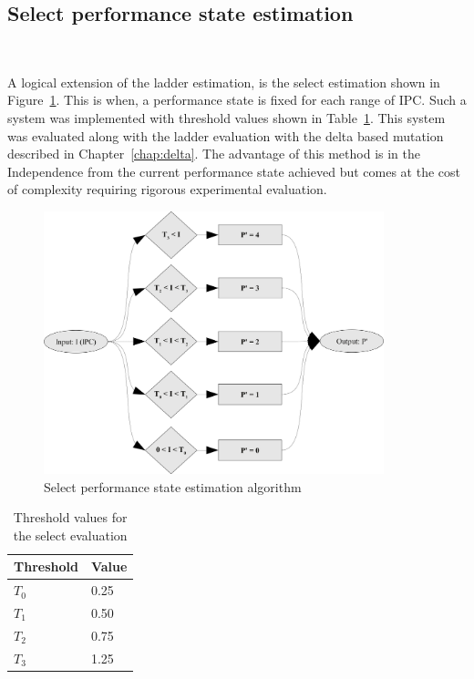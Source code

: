 \subsection{Select performance state estimation}~\label{sec:select}

A logical extension of the ladder estimation, is the select estimation shown in Figure~\ref{fig:select_method}.
This is when, a performance state is fixed for each range of IPC. Such a system was implemented with 
threshold values shown in Table~\ref{tab:sel_threshold}. This system was evaluated along with
the ladder evaluation with the delta based mutation described in Chapter~\ref{chap:delta}.
The advantage of this method is in the Independence from the current performance state
achieved but comes at the cost of complexity requiring rigorous experimental evaluation.

\begin{figure}[h!]
  \begin{center}
    \includegraphics[height=3in]{figures/Select_Evaluation.jpg}%
    \caption{Select performance state estimation algorithm}
    \label{fig:select_method}
  \end{center}
\end{figure}

\begin{table}[h!]
 \begin{center}
\begin{tabular}{| l | l | }
\hline	
Threshold & Value \\
\hline
$T_0$ & 0.25  \\
$T_1$ & 0.50  \\
$T_2$ & 0.75  \\
$T_3$ & 1.25  \\
\hline  
\end{tabular}
 \end{center}
\caption{Threshold values for the select evaluation}
\label{tab:sel_threshold}
\end{table}



